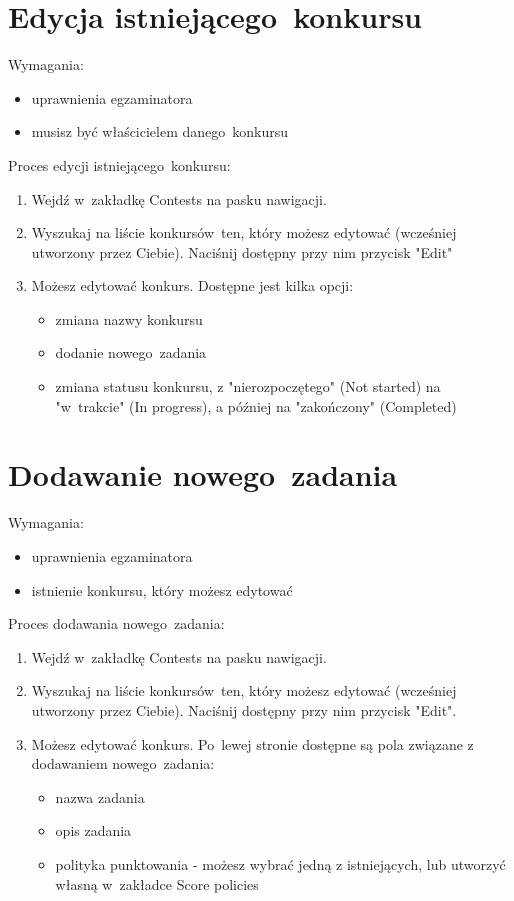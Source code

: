 \documentclass{article}
\begin{document}
\section{Edycja istniejącego~konkursu}
Wymagania:
\begin{itemize}
	\item uprawnienia egzaminatora
	\item musisz być właścicielem danego~konkursu
\end{itemize}
Proces edycji istniejącego~konkursu:
\begin{enumerate}
	\item Wejdź w~zakładkę Contests na pasku nawigacji.
	\item Wyszukaj na liście konkursów~ten, który możesz edytować (wcześniej utworzony przez Ciebie). Naciśnij dostępny przy nim przycisk "Edit"
	\item Możesz edytować konkurs. Dostępne jest kilka opcji:
	\begin{itemize}
		\item zmiana nazwy konkursu
		\item dodanie nowego~zadania
		\item zmiana statusu konkursu, z "nierozpoczętego" (Not started) na "w~trakcie" (In progress), a później na "zakończony" (Completed)
	\end{itemize}
\end{enumerate}

\section{Dodawanie nowego~zadania}
Wymagania:
\begin{itemize}
	\item uprawnienia egzaminatora
	\item istnienie konkursu, który możesz edytować
\end{itemize}
Proces dodawania nowego~zadania:
\begin{enumerate}
	\item Wejdź w~zakładkę Contests na pasku nawigacji.
	\item Wyszukaj na liście konkursów~ten, który możesz edytować (wcześniej utworzony przez Ciebie). Naciśnij dostępny przy nim przycisk "Edit".
	\item Możesz edytować konkurs. Po~lewej stronie dostępne są pola związane z dodawaniem nowego~zadania:
	\begin{itemize}
		\item nazwa zadania
		\item opis zadania
		\item polityka punktowania - możesz wybrać jedną z istniejących, lub utworzyć własną w~zakładce Score policies
	\end{itemize}
\end{enumerate}
\end{document}
